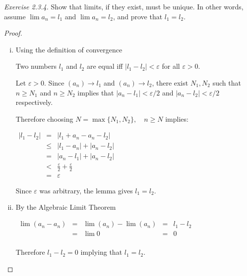 \noindent
\emph{Exercise 2.3.4.}  Show that limits, if they exist, must be unique. In other words, assume $\lim a_n = l_1$ and $\lim a_n = l_2$, and prove that $l_1 = l_2$.
\begin{proof}
\begin{enumerate}[(i)]
	\item    Using the definition of convergence
	\noindent {}\begin{lemma}  Two numbers $l_1$ and $l_2$ are equal iff $|l_1 - l_2 |< \varepsilon$ for all $\varepsilon > 0$.
		\end{lemma} 
	
	Let $\varepsilon > 0$.  Since $(a_n) \to l_1$ and $(a_n) \to l_2$, there exist $N_1, N_2$ such that $n \geq N_1$ and $n \geq N_2$ implies that $|a_n - l_1| < \varepsilon/2$ and $|a_n - l_2| < \varepsilon/2$  respectively.
	
	Therefore choosing $N = \max\{N_1, N_2\}, \quad n \geq N$ implies:


$\begin{array} {lcl} 
|l_1 - l_2|& = &|l_1 + a_n - a_n - l_2 | \\ 
	& \leq & |l_1 - a_n | +  |a_n - l_2 |\\
	& = & |a_n - l_1 | + |a_n - l_2 |\\
	& < & \frac{\varepsilon}{2} + \frac{\varepsilon}{2} \\
	&=& \varepsilon
    \end{array}$	 
    
    Since $\varepsilon$ was arbitrary, the lemma gives $l_1 = l_2$.

	\item  By the Algebraic Limit Theorem
	
	$\begin{array} {lclcl} 
\lim (a_n - a_n)& = &\lim (a_n) -\lim (a_n)  &=& l_{1} - l_{2}\\ 
			& = &\lim 0 			&=& 0 \\
    \end{array}	$
    
    Therefore $l_1 - l_2 = 0$ implying that $l_1 = l_2$.
	
\end{enumerate}
\end{proof}

